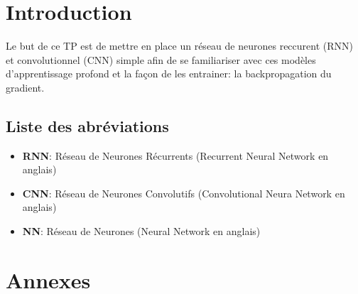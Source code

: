 \documentclass[a4paper, 12pt, openany]{book}
\makeatletter
\renewcommand\mainmatter{%
  \pagenumbering{arabic}
  \@mainmattertrue}
\makeatother
\begin{document}
\tableofcontents 

\clearpage %

\frontmatter

\chapter{Introduction}
Le but de ce TP est de mettre en place un réseau de neurones reccurent (RNN) et convolutionnel (CNN) simple afin de se familiariser avec ces modèles d'apprentissage profond
et la façon de les entrainer: la backpropagation du gradient.

\section{Liste des abréviations} %
\begin{itemize}
  \item \textbf{RNN}: Réseau de Neurones Récurrents (Recurrent Neural Network en anglais)
  \item \textbf{CNN}: Réseau de Neurones Convolutifs (Convolutional Neura Network en anglais)
  \item \textbf{NN}: Réseau de Neurones (Neural Network en anglais)
\end{itemize}


\mainmatter



\newpage
\appendix
\titleformat{\chapter}[hang]{\LARGE\bfseries}{\textcolor{titlecolor}{}}{0.5em}{\textcolor{titlecolor}}
\chapter{Annexes}\label{annexe}


\end{document}
